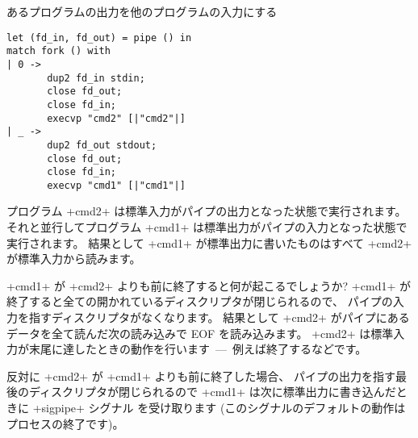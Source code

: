 \begin{example} %
あるプログラムの出力を他のプログラムの入力にする
%
\begin{lstlisting}
let (fd_in, fd_out) = pipe () in
match fork () with
| 0 ->
       dup2 fd_in stdin;
       close fd_out;
       close fd_in;
       execvp "cmd2" [|"cmd2"|]
| _ ->
       dup2 fd_out stdout;
       close fd_out;
       close fd_in;
       execvp "cmd1" [|"cmd1"|]
\end{lstlisting}
%
プログラム \ml+cmd2+ は標準入力がパイプの出力となった状態で実行されます。
それと並行してプログラム \ml+cmd1+ は標準出力がパイプの入力となった状態で実行されます。
結果として \ml+cmd1+ が標準出力に書いたものはすべて \ml+cmd2+ が標準入力から読みます。

\ml+cmd1+ が \ml+cmd2+ よりも前に終了すると何が起こるでしょうか?
\ml+cmd1+ が終了すると全ての開かれているディスクリプタが閉じられるので、
パイプの入力を指すディスクリプタがなくなります。
結果として \ml+cmd2+ がパイプにあるデータを全て読んだ次の読み込みで EOF を読み込みます。
\ml+cmd2+ は標準入力が末尾に達したときの動作を行います~---~例えば終了するなどです。


反対に \ml+cmd2+ が \ml+cmd1+ よりも前に終了した場合、
パイプの出力を指す最後のディスクリプタが閉じられるので \ml+cmd1+ は次に標準出力に書き込んだときに \ml+sigpipe+ シグナル
を受け取ります (このシグナルのデフォルトの動作はプロセスの終了です)。


\end{example}

